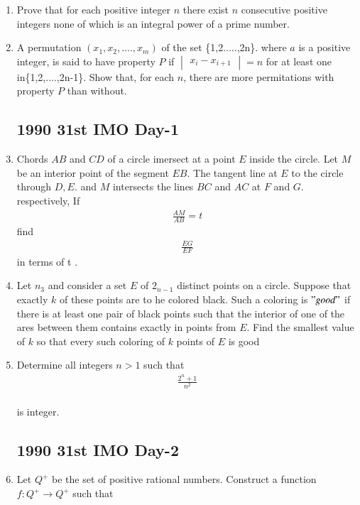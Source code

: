 \documentclass[12pt,-letter paper]{article}
\providecommand{\mydet}[1]{\ensuremath{\begin{vmatrix}#1\end{vmatrix}}}
\providecommand{\brak}[1]{\ensuremath{\left(#1\right)}}
\begin{document}
\begin{enumerate}
	\item Prove that for each positive integer $n$ there exist $n$ consecutive positive integers none of which is an integral power of a prime number.

	\item A permutation $\brak{x_1,x_2,....,x_m}$ of the set \{1,2.....,2n\}. where $a$ is a positive integer, is said to have property $P$ if $\mydet{x_i - x_{i+1}} = n $ for at least one in\{1,2,....,2n-1\}. Show that, for each $n$, there are more permitations with property $P$ than without.


  \subsection*{1990  31st IMO Day-1}


	\item Chords $AB$ and $CD$ of a circle imersect at a point $E$ inside the circle. Let $M$ be an interior point of the segment $EB$. The tangent line at $E$ to the circle through $D, E$. and $M$ intersects the lines $BC$ and $AC$ at $F$ and $G$. respectively,
		If \begin{align*}\frac{AM}{AB}=t \end{align*}
			find \begin{align*} \frac{EG}{EF}\end{align*}
		in terms of t .
	\item Let $n_3$ and consider a set $E$ of $2_{n-1}$ distinct points on a circle. Suppose that exactly $k$ of these points are to he colored black. Such a coloring is $"good"$ if there is at least one pair of black points such that the interior of one of the ares between them contains exactly in points from $E$. Find the smallest value of $k$ so that every such coloring of $k$ points of $E$ is good

	\item Determine all integers $n>1$  such that
		\begin{align*} \frac{{2^n}+1}{n^2}\end{align*}\\ is integer.



	\subsection*{1990  31st IMO Day-2}



		\item Let $Q^+$ be the set of positive rational numbers. Construct a function $ f: Q^+ \rightarrow Q^+$ such that 


\end{enumerate}
\end{document}

